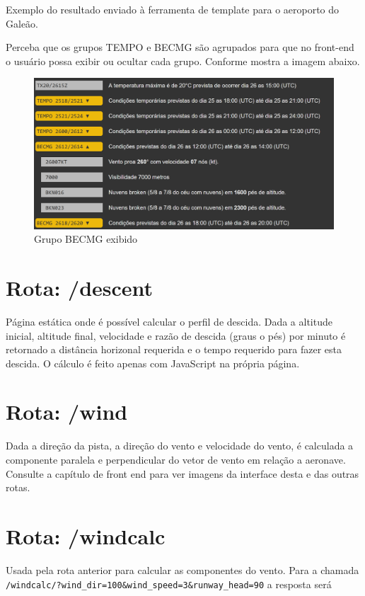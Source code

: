 Exemplo do resultado enviado à ferramenta de template para o aeroporto do Galeão.




Perceba que os grupos TEMPO e BECMG são agrupados para que no front-end o usuário 
possa exibir ou ocultar cada grupo. Conforme mostra a imagem abaixo.


\begin{figure}[ht]
    \begin{center}
    \includegraphics[width=400pt]{img/BECMG-exibido.png}
    \caption{Grupo BECMG exibido}
    \label{fig:becmg-exibido}
    \end{center}
\end{figure}

\section{Rota: /descent}

Página estática onde é possível calcular o perfil de descida. Dada a altitude
inicial, altitude final, velocidade e razão de descida (graus o pés) por minuto
é retornado a distância horizonal requerida e o tempo requerido para fazer esta
descida. O cálculo é feito apenas com JavaScript na própria página.

\section{Rota: /wind}
Dada a direção da pista, a direção do vento e velocidade do vento, é calculada
a componente paralela e perpendicular do vetor de vento em relação a aeronave.
Consulte a capítulo de front end para ver imagens da interface desta e das outras
rotas.

\section{Rota: /windcalc}
Usada pela rota anterior para calcular as componentes do vento. Para a chamada
\verb|/windcalc/?wind_dir=100&wind_speed=3&runway_head=90| a resposta será

